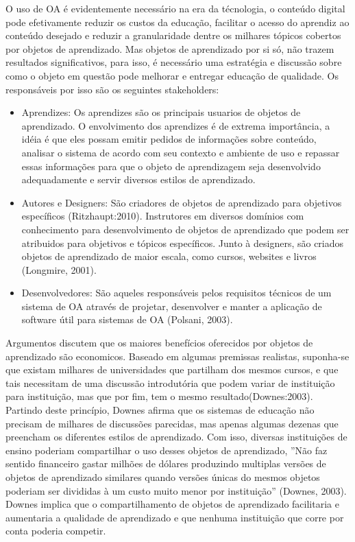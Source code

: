 \documentclass[12pt,openright,oneside,a4paper,english,french,spanish,brazil]{unifil}
\begin{document}
O uso de OA é evidentemente necessário na era da técnologia, o conteúdo digital pode efetivamente reduzir os custos da educação, facilitar o acesso do aprendiz ao conteúdo desejado e reduzir a granularidade dentre os milhares tópicos cobertos por objetos de aprendizado.
Mas objetos de aprendizado por si só, não trazem resultados significativos, para isso, é necessário uma estratégia e discussão sobre como o objeto em questão pode melhorar e entregar educação de qualidade. Os responsáveis por isso são os seguintes stakeholders:

\begin{itemize}
\item Aprendizes: Os aprendizes são os principais usuarios de objetos de aprendizado. O envolvimento dos aprendizes é de extrema importância, a idéia é que eles possam emitir pedidos de informações sobre conteúdo, analisar o sistema de acordo com seu contexto e ambiente de uso e repassar essas informações para que o objeto de aprendizagem seja desenvolvido adequadamente e servir diversos estilos de aprendizado.
\item Autores e Designers: São criadores de objetos de aprendizado para objetivos específicos (Ritzhaupt:2010). Instrutores em diversos domínios com conhecimento para desenvolvimento de objetos de aprendizado que podem ser atribuidos para objetivos e tópicos específicos. Junto à designers, são criados objetos de aprendizado de maior escala, como cursos, websites e livros (Longmire, 2001).
\item Desenvolvedores: São aqueles responsáveis pelos requisitos técnicos de um sistema de OA através de projetar, desenvolver e manter a aplicação de software útil para sistemas de OA (Polsani, 2003). 
\end{itemize}

Argumentos discutem que os maiores benefícios oferecidos por objetos de aprendizado são economicos. Baseado em algumas premissas realistas, suponha-se que existam milhares de universidades que partilham dos mesmos cursos, e que tais necessitam de uma discussão introdutória que podem variar de instituição para instituição, mas que por fim, tem o mesmo resultado(Downes:2003). Partindo deste princípio, Downes afirma que os sistemas de educação não precisam de milhares de discussões parecidas, mas apenas algumas dezenas que preencham os diferentes estilos de aprendizado. Com isso, diversas instituições de ensino poderiam compartilhar o uso desses objetos de aprendizado, ''Não faz sentido financeiro gastar milhões de dólares produzindo multiplas versões de objetos de aprendizado similares quando versões únicas do mesmos objetos poderiam ser divididas à um custo muito menor por instituição'' (Downes, 2003). Downes implica que o compartilhamento de objetos de aprendizado facilitaria e aumentaria a qualidade de aprendizado e que nenhuma instituição que corre por conta poderia competir.
\end{document}
